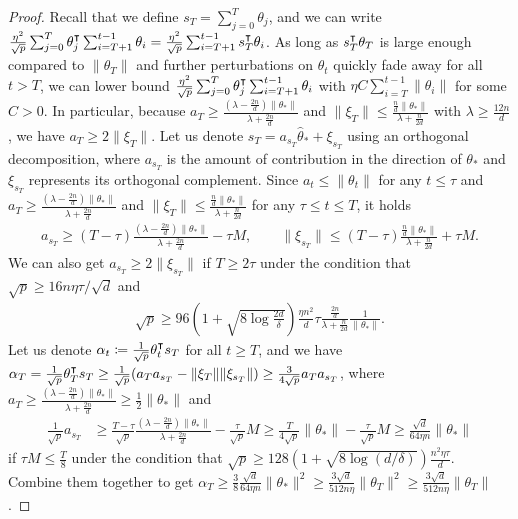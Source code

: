 \begin{proof}
    Recall that we define $s_T = \sum_{j=0}^T \theta_j$, and we can write $\frac{\eta^2}{\sqrt p}\sum_{j=0}^T \theta_j\transpose \sum_{i=T+1}^{t-1} \theta_i = \frac{\eta^2}{\sqrt p} \sum_{i=T+1}^{t-1} s_T\transpose \theta_i$. As long as $s_T\transpose \theta_T$ is large enough compared to $\|\theta_T\|$ and further perturbations on $\theta_t$ quickly fade away for all $t > T$, we can lower bound $\frac{\eta^2}{\sqrt p}\sum_{j=0}^T \theta_j\transpose \sum_{i=T+1}^{t-1} \theta_i$ with $\eta C\sum_{i=T}^{t-1} \|\theta_i\|$ for some $C>0$. In particular, because $a_T \geq \frac{(\lambda - \frac{2n}{d})\|\theta_*\|}{\lambda + \frac{2n}{d}}$ and $\|\xi_T\| \leq \frac{\frac{n}{d}\|\theta_*\|}{\lambda + \frac{n}{2d}}$ with $\lambda\geq \frac{12n}{d}$, we have $a_T \geq 2\|\xi_T\|$. Let us denote $s_T = a_{s_T}\hat\theta_* + \xi_{s_T}$ using an orthogonal decomposition, where $a_{s_T}$ is the amount of contribution in the direction of $\theta_*$ and $\xi_{s_T}$ represents its orthogonal complement. Since $a_t\leq \|\theta_t\|$ for any $t\leq \tau$ and $a_T \geq \frac{(\lambda - \frac{2n}{d})\|\theta_*\|}{\lambda + \frac{2n}{d}}$ and $\|\xi_T\| \leq \frac{\frac{n}{d}\|\theta_*\|}{\lambda + \frac{n}{2d}}$ for any $\tau\leq t\leq T$, it holds
    \begin{align*}
        a_{s_T} \geq (T-\tau) \frac{(\lambda - \frac{2n}{d})\|\theta_*\|}{\lambda + \frac{2n}{d}} - \tau M, \qquad \|\xi_{s_T}\| \leq (T-\tau) \frac{\frac{n}{d}\|\theta_*\|}{\lambda + \frac{n}{2d}} + \tau M.
    \end{align*}
    We can also get $a_{s_T} \geq 2 \|\xi_{s_T}\|$ if $T \geq 2\tau$ under the condition that $\sqrt{p} \geq 16n\eta\tau/\sqrt{d}$ and 
    \begin{align*}
        \sqrt{p} \geq 96\left(1 + \sqrt{8\log\frac{2d}{\delta}}\right)\frac{\eta n^2}{d}\tau \frac{\frac{2n}{d}}{\lambda + \frac{n}{2d}}\frac{1}{\|\theta_*\|}.
    \end{align*}
    Let us denote $\alpha_t \defeq \frac{1}{\sqrt{p}}\theta_t\transpose s_T$ for all $t\geq T$, and we have $\alpha_T = \frac{1}{\sqrt{p}}\theta_T\transpose s_T \geq \frac{1}{\sqrt{p}}(a_T a_{s_T} - \|\xi_T\|\|\xi_{s_T}\|) \geq \frac{3}{4\sqrt{p}} a_T a_{s_T}$, where $a_T \geq \frac{(\lambda - \frac{2n}{d})\|\theta_*\|}{\lambda + \frac{2n}{d}} \geq \frac{1}{2}\|\theta_*\|$ and 
    \begin{align*}
        \frac{1}{\sqrt{p}} a_{s_T} & \geq \frac{T-\tau}{\sqrt{p}} \frac{(\lambda - \frac{2n}{d})\|\theta_*\|}{\lambda + \frac{2n}{d}} - \frac{\tau}{\sqrt{p}} M \geq \frac{T}{4\sqrt{p}} \|\theta_*\| - \frac{\tau}{\sqrt{p}} M \geq \frac{\sqrt{d}}{64\eta n} \|\theta_*\|
    \end{align*}
    if $\tau M \leq \frac{T}{8}$ under the condition that $\sqrt{p}\geq 128 \left(1 + \sqrt{8\log(d/\delta)}\right) \frac{n^2\eta\tau}{d}$. Combine them together to get $\alpha_T \geq \frac{3}{8}\frac{\sqrt{d}}{64\eta n} \|\theta_*\|^2 \geq \frac{3\sqrt{d}}{512n\eta} \|\theta_T\|^2 \geq \frac{3\sqrt{d}}{512n\eta} \|\theta_T\|$ .
    

\end{proof}
